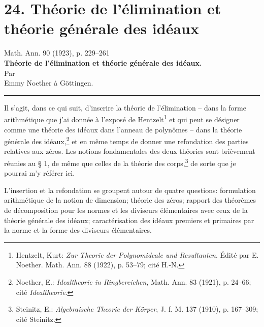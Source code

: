 \setcounter{footnote}{0}
\providecommand{\frakS}{\mathfrak S}
\providecommand{\fraka}{\mathfrak a}
\providecommand{\frakb}{\mathfrak b}
\providecommand{\frakc}{\mathfrak c}
\providecommand{\frakg}{\mathfrak g}
\providecommand{\frakG}{\mathfrak G}
\providecommand{\frakh}{\mathfrak h}
\providecommand{\frakm}{\mathfrak m}
\providecommand{\frakM}{\mathfrak M}
\providecommand{\frakn}{\mathfrak n}
\providecommand{\frako}{\mathfrak o}
\providecommand{\frakp}{\mathfrak p}
\providecommand{\frakq}{\mathfrak q}
\providecommand{\frakr}{\mathfrak r}
\providecommand{\barfrakm}{\overline{\mathfrak m}}

\section*{24. Théorie de l'élimination et théorie générale des idéaux}
\begin{center}
Math. Ann. 90 (1923), p. 229--261\\[0.9em]
{\Large\bfseries Théorie de l'élimination et théorie générale des idéaux.}\\[1.0em]
Par\\[0.45em]
Emmy Noether à Göttingen.\\[0.6em]
\rule{4em}{0.4pt}
\end{center}

Il s'agit, dans ce qui suit, d'inscrire la théorie de l'élimination -- dans la forme arithmétique que j'ai donnée à l'exposé de Hentzelt\footnote{Hentzelt, Kurt: \emph{Zur Theorie der Polynomideale und Resultanten}. Édité par E. Noether. Math. Ann. 88 (1922), p. 53--79; cité H.-N.} et qui peut se désigner comme une théorie des idéaux dans l'anneau de polynômes -- dans la théorie générale des idéaux,\footnote{Noether, E.: \emph{Idealtheorie in Ringbereichen}, Math. Ann. 83 (1921), p. 24--66; cité \emph{Idealtheorie}.} et en même temps de donner une refondation des parties relatives aux zéros. Les notions fondamentales des deux théories sont brièvement réunies au \S{} 1, de même que celles de la théorie des corps,\footnote{Steinitz, E.: \emph{Algebraische Theorie der Körper}, J. f. M. 137 (1910), p. 167--309; cité Steinitz.} de sorte que je pourrai m'y référer ici.

L'insertion et la refondation se groupent autour de quatre questions: formulation arithmétique de la notion de dimension; théorie des zéros; rapport des théorèmes de décomposition pour les normes et les diviseurs élémentaires avec ceux de la théorie générale des idéaux; caractérisation des idéaux premiers et primaires par la norme et la forme des diviseurs élémentaires.

